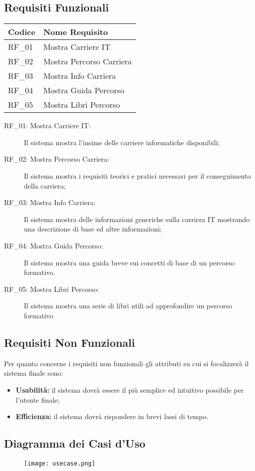 \subsection{Requisiti Funzionali}
\begin{center}
\begin{tabular}{|l|l|}
\hline
\textbf{Codice} & \textbf{Nome Requisito}\\ 
\hline
RF\_01 & Mostra Carriere IT\\
\hline 
RF\_02 & Mostra Percorso Carriera\\
\hline
RF\_03 & Mostra Info Carriera\\
\hline
RF\_04 & Mostra Guida Percorso\\
\hline
RF\_05 & Mostra Libri Percorso \\
\hline
\end{tabular}
\end{center}
\begin{description}
 \item [RF\_01: Mostra Carriere IT:] Il sistema mostra l'insime delle carriere informatiche disponibili;
 \item[RF\_02: Mostra Percorso Carriera:] Il sistema mostra i requisiti teorici e pratici necessari per il conseguimento della carriera;
 \item[RF\_03: Mostra Info Carriera:] Il sistema mostra delle informazioni generiche sulla carriera IT mostrando una descrizione di base ed altre informazioni;
 \item[RF\_04: Mostra Guida Percorso:] Il sistema mostra una guida breve sui concetti di base di un percorso formativo.
 \item[RF\_05: Mostra Libri Percorso:] Il sistema mostra una serie di libri utili ad approfondire un percorso formativo
\end{description}
\subsection{Requisiti Non Funzionali}
Per quanto concerne i requisiti non funzionali gli attributi su cui si focalizzerà il sistema finale sono:
\begin{itemize}
 \item \textbf{Usabilità:} il sistema dovrà essere il più semplice ed intuitivo possibile per l'utente finale;
 \item \textbf{Efficienza:} il sistema dovrà rispondere in brevi lassi di tempo.
\end{itemize}
\subsection{Diagramma dei Casi d'Uso}
\begin{figure}[H]
 \texttt{[image: usecase.png]}
\end{figure}
